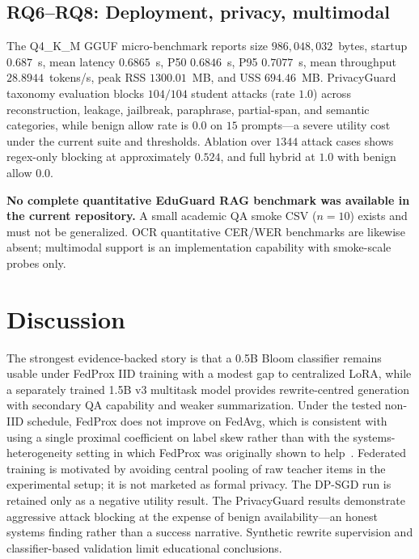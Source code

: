 \documentclass[journal]{IEEEtran}
\begin{document}
\subsection{RQ6--RQ8: Deployment, privacy, multimodal}
The Q4\_K\_M GGUF micro-benchmark reports size $986{,}048{,}032$~bytes, startup $0.687$~s, mean latency $0.6865$~s, P50 $0.6846$~s, P95 $0.7077$~s, mean throughput $28.8944$~tokens/s, peak RSS $1300.01$~MB, and USS $694.46$~MB.
PrivacyGuard taxonomy evaluation blocks $104/104$ student attacks (rate $1.0$) across reconstruction, leakage, jailbreak, paraphrase, partial-span, and semantic categories, while benign allow rate is $0.0$ on $15$ prompts---a severe utility cost under the current suite and thresholds.
Ablation over $1344$ attack cases shows regex-only blocking at approximately $0.524$, and full hybrid at $1.0$ with benign allow $0.0$.

\textbf{No complete quantitative EduGuard RAG benchmark was available in the current repository.}
A small academic QA smoke CSV ($n{=}10$) exists and must not be generalized.
OCR quantitative CER/WER benchmarks are likewise absent; multimodal support is an implementation capability with smoke-scale probes only.

\section{Discussion}
The strongest evidence-backed story is that a 0.5B Bloom classifier remains usable under FedProx IID training with a modest gap to centralized LoRA, while a separately trained 1.5B v3 multitask model provides rewrite-centred generation with secondary QA capability and weaker summarization.
Under the tested non-IID schedule, FedProx does not improve on FedAvg, which is consistent with using a single proximal coefficient on label skew rather than with the systems-heterogeneity setting in which FedProx was originally shown to help~\cite{li2020fedprox}.
Federated training is motivated by avoiding central pooling of raw teacher items in the experimental setup; it is not marketed as formal privacy.
The DP-SGD run is retained only as a negative utility result.
The PrivacyGuard results demonstrate aggressive attack blocking at the expense of benign availability---an honest systems finding rather than a success narrative.
Synthetic rewrite supervision and classifier-based validation limit educational conclusions.
\end{document}
